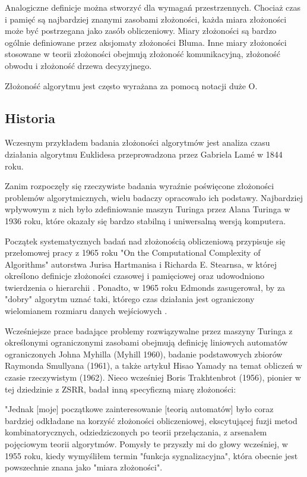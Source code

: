 Analogiczne definicje można stworzyć dla wymagań przestrzennych. Chociaż czas i pamięć są najbardziej znanymi zasobami złożoności, każda miara złożoności może być postrzegana jako zasób obliczeniowy. Miary złożoności są bardzo ogólnie definiowane przez aksjomaty złożoności Bluma. Inne miary złożoności stosowane w teorii złożoności obejmują złożoność komunikacyjną, złożoność obwodu i złożoność drzewa decyzyjnego.

Złożoność algorytmu jest często wyrażana za pomocą notacji duże O.

	\subsection{Historia}

Wczesnym przykładem badania złożoności algorytmów jest analiza czasu działania algorytmu Euklidesa przeprowadzona przez Gabriela Lamé w 1844 roku.

Zanim rozpoczęły się rzeczywiste badania wyraźnie poświęcone złożoności problemów algorytmicznych, wielu badaczy opracowało ich podstawy. Najbardziej wpływowym z nich było zdefiniowanie maszyn Turinga przez Alana Turinga w 1936 roku, które okazały się bardzo stabilną i uniwersalną wersją komputera.

Początek systematycznych badań nad złożonością obliczeniową przypisuje się przełomowej pracy z 1965 roku "On the Computational Complexity of Algorithms" autorstwa Jurisa Hartmanisa i Richarda E. Stearnsa, w której określono definicje złożoności czasowej i pamięciowej oraz udowodniono twierdzenia o hierarchii \cite{FortnowH03}. Ponadto, w 1965 roku Edmonds zasugerował, by za "dobry" algorytm uznać taki, którego czas działania jest ograniczony wielomianem rozmiaru danych wejściowych \cite{Karp86}.

Wcześniejsze prace badające problemy rozwiązywalne przez maszyny Turinga z określonymi ograniczonymi zasobami obejmują \cite{FortnowH03} definicję liniowych automatów ograniczonych Johna Myhilla (Myhill 1960), badanie podstawowych zbiorów Raymonda Smullyana (1961), a także artykuł Hisao Yamady \cite{Yamada62a} na temat obliczeń w czasie rzeczywistym (1962). Nieco wcześniej Boris Trakhtenbrot (1956), pionier w tej dziedzinie z ZSRR, badał inną specyficzną miarę złożoności:

"Jednak [moje] początkowe zainteresowanie [teorią automatów] było coraz bardziej odkładane na korzyść złożoności obliczeniowej, ekscytującej fuzji metod kombinatorycznych, odziedziczonych po teorii przełączania, z arsenałem pojęciowym teorii algorytmów. Pomysły te przyszły mi do głowy wcześniej, w 1955 roku, kiedy wymyśliłem termin "funkcja sygnalizacyjna", która obecnie jest powszechnie znana jako "miara złożoności"\cite{Trakhtenbrot08}.

